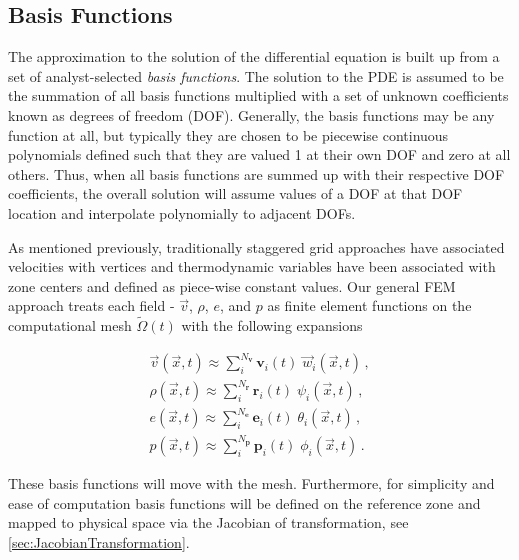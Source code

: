 \subsection{Basis Functions}
The approximation to the solution of the differential equation is built up from a set of analyst-selected \emph{basis functions}. The solution to the PDE is assumed to be the summation of all basis functions multiplied with a set of unknown coefficients known as degrees of freedom (DOF). Generally, the basis functions may be any function at all, but typically they are chosen to be piecewise continuous polynomials defined such that they are valued 1 at their own DOF and zero at all others. Thus, when all basis functions are summed up with their respective DOF coefficients, the overall solution will assume values of a DOF at that DOF location and interpolate polynomially to adjacent DOFs. 

As mentioned previously, traditionally staggered grid approaches have associated velocities with vertices and thermodynamic variables have been associated with zone centers and defined as piece-wise constant values. Our general FEM approach treats each field -  $\vec{v}$, $\rho$, $e$, and $p$ as finite element functions on the computational mesh $\tilde\Omega(t)$ with the following expansions

\begin{eqnarray}
  \vec v(\vec x,t) \approx
  \sum_{i}^{N_\mathbf{v}} \mathbf{v}_i(t) \; \vec w_i(\vec x, t) \,,
  \label{eq:DiscreteV} \\
  \rho(\vec x,t)  \approx
  \sum_{i}^{N_\mathbf{r}} \mathbf{r}_i(t) \; \psi_i(\vec x, t) \,, \label{eq:DiscreteRho} \\
  e(\vec x,t)  \approx
  \sum_{i}^{N_\mathbf{e}} \mathbf{e}_i(t) \; \theta_i(\vec x, t) \,, \label{eq:DiscreteE} \\
  p(\vec x,t) \approx
  \sum_{i}^{N_\mathbf{p}} \mathbf{p}_i(t) \; \phi_i(\vec x, t) \,.
  \label{eq:DiscreteP}
\end{eqnarray}

These basis functions will move with the mesh. Furthermore, for simplicity and ease of computation basis functions will be defined on the reference zone and mapped to physical space via the Jacobian of transformation, see \ref{sec:JacobianTransformation}.

